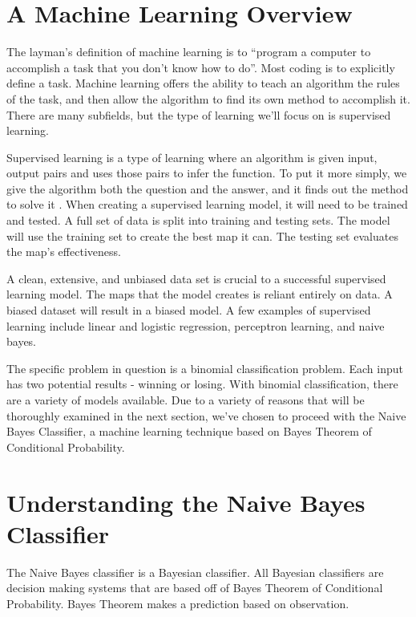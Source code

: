\documentclass[11pt, twoside, reqno]{book}
\begin{document}
\section{A Machine Learning Overview}
\hspace{0.2in} The layman's definition of machine learning is to ``program a computer to accomplish a task that you don't know how to do''. Most coding is to explicitly define a task. Machine learning offers the ability to teach an algorithm the rules of the task, and then allow the algorithm to find its own method to accomplish it. There are many subfields, but the type of learning we'll focus on is supervised learning. 

Supervised learning is a type of learning where an algorithm is given input, output pairs and uses those pairs to infer the function. To put it more simply, we give the algorithm both the question and the answer, and it finds out the method to solve it \cite{ng2000cs229}. When creating a supervised learning model, it will need to be trained and tested. A full set of data is split into training and testing sets. The model will use the training set to create the best map it can. The testing set evaluates the map's effectiveness. 

A clean, extensive, and unbiased data set is crucial to a successful supervised learning model. The maps that the model creates is reliant entirely on data. A biased dataset will result in a biased model. A few examples of supervised learning include linear and logistic regression, perceptron learning, and naive bayes. 

The specific problem in question is a binomial classification problem. Each input has two potential results - winning or losing. With binomial classification, there are a variety of models available. Due to a variety of reasons that will be thoroughly examined in the next section, we've chosen to proceed with the Naive Bayes Classifier, a machine learning technique based on Bayes Theorem of Conditional Probability. 

\section{Understanding the Naive Bayes Classifier}
\hspace{0.2in} The Naive Bayes classifier is a Bayesian classifier. All Bayesian classifiers are decision making systems that are based off of Bayes Theorem of Conditional Probability. Bayes Theorem makes a prediction based on observation. 
\end{document}
